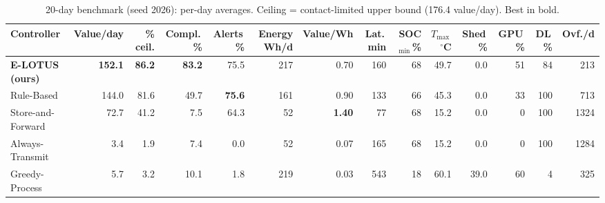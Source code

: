 \begin{table}[t]
\centering
\caption{20-day benchmark (seed 2026): per-day averages. Ceiling = contact-limited upper bound (176.4 value/day). Best in bold.}\label{tab:main}
\footnotesize
\setlength{\tabcolsep}{3.1pt}
\begin{tabular}{@{}lrrrrrrrrrrrrr@{}}
\toprule
Controller & Value/day & \% ceil. & Compl.\,\% & Alerts\,\% & Energy Wh/d & Value/Wh & Lat.\,min & SOC$_{\min}$\,\% & $T_{\max}$\,$^\circ$C & Shed\,\% & GPU\,\% & DL\,\% & Ovf./d\\
\midrule
\textbf{E-LOTUS (ours)} & \textbf{152.1} & \textbf{86.2} & \textbf{83.2} & 75.5 & 217 & 0.70 & 160 & 68 & 49.7 & 0.0 & 51 & 84 & 213\\
Rule-Based & 144.0 & 81.6 & 49.7 & \textbf{75.6} & 161 & 0.90 & 133 & 66 & 45.3 & 0.0 & 33 & 100 & 713\\
Store-and-Forward & 72.7 & 41.2 & 7.5 & 64.3 & 52 & \textbf{1.40} & 77 & 68 & 15.2 & 0.0 & 0 & 100 & 1324\\
Always-Transmit & 3.4 & 1.9 & 7.4 & 0.0 & 52 & 0.07 & 165 & 68 & 15.2 & 0.0 & 0 & 100 & 1284\\
Greedy-Process & 5.7 & 3.2 & 10.1 & 1.8 & 219 & 0.03 & 543 & 18 & 60.1 & 39.0 & 60 & 4 & 325\\
\bottomrule
\end{tabular}
\end{table}
